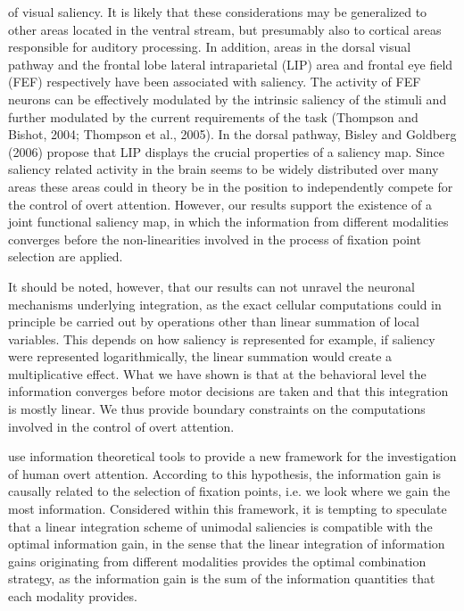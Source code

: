 of visual saliency. It is likely that these considerations may be
generalized to other areas located in the ventral stream, but presumably
also to cortical areas responsible for auditory processing. In addition,
areas in the dorsal visual pathway and the frontal lobe \textemdash lateral
intraparietal (LIP) area and
frontal eye field (FEF) respectively
\textemdash have been associated with saliency. The activity of FEF neurons
can be effectively modulated by the intrinsic saliency of the stimuli and
further modulated by the current requirements of the task (Thompson and
Bishot, 2004; Thompson et al., 2005). In the dorsal pathway, Bisley and
Goldberg (2006) propose that LIP displays the crucial properties of a
saliency map. Since saliency related activity in the brain seems to be
widely distributed over many areas these areas could in theory be in the
position to independently compete for the control of overt attention.
However, our results support the existence of a joint functional saliency
map, in which the information from different modalities converges before
the non-linearities involved in the process of fixation point selection are
applied. 

It should be noted, however, that our results can not unravel the neuronal
mechanisms underlying integration, as the exact cellular computations could
in principle be carried out by operations other than linear summation of
local variables. This depends on how saliency is represented \textemdash for example,
if saliency were represented logarithmically, the linear summation would
create a multiplicative effect. What we have shown is that at the
behavioral level the information converges before motor decisions are taken
and that this integration is mostly linear. We thus provide boundary
constraints on the computations involved in the control of overt attention. 

\cite{renninger2005a} use information theoretical tools to provide a new
framework for the investigation of human overt attention. According to this
hypothesis, the information gain is causally related to the selection of
fixation points, i.e. we look where we gain the most information.
Considered within this framework, it is tempting to speculate that a linear
integration scheme of unimodal saliencies is compatible with the optimal
information gain, in the sense that the linear integration of information
gains originating from different modalities provides the optimal
combination strategy, as the information gain is the sum of the information
quantities that each modality provides.

